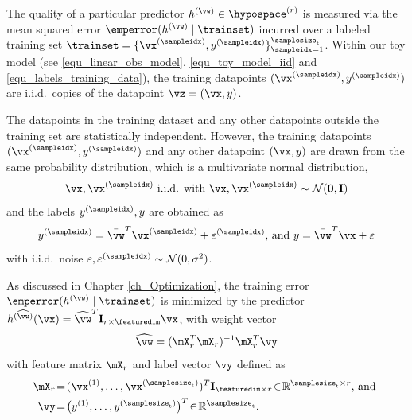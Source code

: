 \documentclass[12pt]{report}
\begin{document}
The quality of a particular predictor $h^{(\vw)} \in \hypospace^{(r)}$ is measured 
via the mean squared error $\emperror (h^{(\vw)} \mid \trainset)$ incurred over a 
labeled training set $\trainset= \{ \vx^{(\sampleidx)}, y^{(\sampleidx)} \}_{\sampleidx=1}^{\samplesize_{\rm t}}$. 
Within our toy model (see \eqref{equ_linear_obs_model}, \eqref{equ_toy_model_iid} 
and \eqref{equ_labels_training_data}), the training datapoints $(\vx^{(\sampleidx)},y^{(\sampleidx)})$ 
are i.i.d.\ copies of the datapoint $\vz = (\vx,y)$. 

The datapoints in the training dataset and any other datapoints outside the 
training set are statistically independent. However, the training datapoints 
$(\vx^{(\sampleidx)},y^{(\sampleidx)})$ and any other datapoint $(\vx,y)$ are 
drawn from  the same probability distribution, which is a multivariate normal distribution, 
\begin{equation} 
\label{equ_toy_model_iid}
\vx, \vx^{(\sampleidx)} \mbox{ i.i.d. with } \vx, \vx^{(\sampleidx)} \sim \mathcal{N}(\mathbf{0}, \mathbf{I}) 
\end{equation} 
and the labels $y^{(\sampleidx)},y$ are obtained as 
\begin{equation} 
\label{equ_labels_training_data}
y^{(\sampleidx)} = \bar{\vw}^{T}  \vx^{(\sampleidx)} + \varepsilon^{(\sampleidx)}\mbox{, and } y = \bar{\vw}^{T}  \vx + \varepsilon
\end{equation}  
with i.i.d.\ noise $\varepsilon, \varepsilon^{(\sampleidx)} \sim \mathcal{N}(0,\sigma^{2})$. 

As discussed in Chapter \ref{ch_Optimization}, the training error $\emperror (h^{(\vw)} \mid \trainset)$ 
is minimized by the predictor $h^{(\widehat{\vw})}(\vx) =  \widehat{\vw}^{T} \mathbf{I}_{r \times \featuredim} \vx$, 
with weight vector 
\begin{equation}
\label{equ_optimal_weight_closed_form}
\widehat{\vw} =  (\mX^{T}_{r} \mX_{r})^{-1} \mX_{r}^{T} \vy
\end{equation} 
with feature matrix $\mX_{r}$ and label vector $\vy$ defined as 
\begin{align}
\label{equ_def_feature_matrix_r}
\mX_{r}& \!=\!(\vx^{(1)},\ldots,\vx^{(\samplesize_{\rm t})})^{T} \mathbf{I}_{\featuredim \times r}\!\in\!\mathbb{R}^{\samplesize_{\rm t} \times r} \mbox{, and }  \nonumber \\
\vy& \!=\!\big(y^{(1)},\ldots,y^{(\samplesize_{\rm t})}\big)^{T}\!\in\!\mathbb{R}^{\samplesize_{\rm t}}.
\end{align} 
\end{document}
